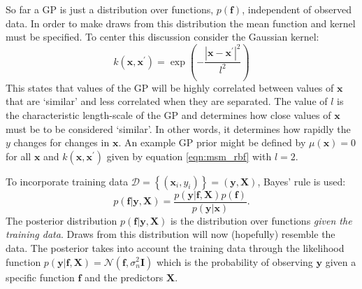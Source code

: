 So far a GP is just a distribution over functions, $p(\mathbf{f})$, independent of observed data. In order to make draws from this distribution the mean function and kernel must be specified. To center this discussion consider the Gaussian kernel: 
\begin{equation}
    k(\mathbf{x}, \mathbf{x}^{\prime}) = \exp{\left(-\frac{\left|\mathbf{x}-\mathbf{x}^{\prime}\right|^{2}}{l^{2}}\right)}
\end{equation}\label{eqn:msm_rbf}
This states that values of the GP will be highly correlated between values of $\mathbf{x}$ that are `similar' and less correlated when they are separated. The value of $l$ is the characteristic length-scale of the GP and determines how close values of $\mathbf{x}$ must be to be considered `similar'\cite{rasmussenGaussianProcessesMachine2006}. In other words, it determines how rapidly the $y$ changes for changes in $\mathbf{x}$. An example GP prior might be defined by $\mu(\mathbf{x})=0$ for all $\mathbf{x}$ and $k(\mathbf{x}, \mathbf{x}^{\prime})$ given by equation \ref{eqn:msm_rbf} with $l=2$.  

To incorporate training data $\mathcal{D}=\left\{(\mathbf{x}_{i}, y_{i})\right\} = (\mathbf{y}, \mathbf{X})$, Bayes' rule is used\cite{rasmussenGaussianProcessesMachine2006}:
\begin{equation}\label{eqn:ya_boy_bayes}
    p(\mathbf{f}|\mathbf{y}, \mathbf{X})  = \frac{p(\mathbf{y}|\mathbf{f}, \mathbf{X})p(\mathbf{f})}{p(\mathbf{y}|\mathbf{x})}. 
\end{equation}
The posterior distribution $p(\mathbf{f}|\mathbf{y}, \mathbf{X})$ is the distribution over functions \emph{given the training data}\cite{gelmanBayesianDataAnalysis2014}. Draws from this distribution will now (hopefully) resemble the data. The posterior takes into account the training data  through the likelihood function $p(\mathbf{y}|\mathbf{f}, \mathbf{X}) = \mathcal{N}(\mathbf{f}, \sigma_{n}^{2}\mathbf{I})$ which is the probability of observing $\mathbf{y}$ given a specific function $\mathbf{f}$ and the predictors $\mathbf{X}$\cite{gelmanBayesianDataAnalysis2014}.


